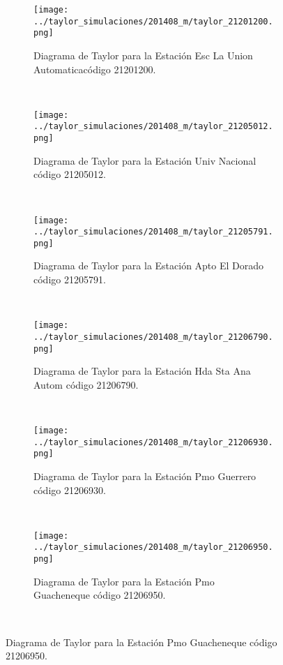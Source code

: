 \begin{figure}[H]
\begin{subfigure}[normla]{0.5\textwidth}
\caption{Diagrama de Taylor para la Estación Esc La Union Automaticacódigo 21201200.}
\texttt{[image: ../taylor\_simulaciones/201408\_m/taylor\_21201200.png]}
\end{subfigure}
~
\begin{subfigure}[normla]{0.5\textwidth}
\caption{Diagrama de Taylor para la Estación Univ Nacional código 21205012.}
\texttt{[image: ../taylor\_simulaciones/201408\_m/taylor\_21205012.png]}
\end{subfigure}
~
\begin{subfigure}[normla]{0.5\textwidth}
\caption{Diagrama de Taylor para la Estación Apto El Dorado código 21205791.}
\texttt{[image: ../taylor\_simulaciones/201408\_m/taylor\_21205791.png]}
\end{subfigure}
~
\begin{subfigure}[normla]{0.5\textwidth}
\caption{Diagrama de Taylor para la Estación Hda Sta Ana Autom código 21206790.}
\texttt{[image: ../taylor\_simulaciones/201408\_m/taylor\_21206790.png]}
\end{subfigure}
~
\begin{subfigure}[normla]{0.5\textwidth}
\caption{Diagrama de Taylor para la Estación Pmo Guerrero código 21206930.}
\texttt{[image: ../taylor\_simulaciones/201408\_m/taylor\_21206930.png]}
\end{subfigure}
~
\begin{subfigure}[normla]{0.5\textwidth}
\caption{Diagrama de Taylor para la Estación Pmo Guacheneque código 21206950.}
\texttt{[image: ../taylor\_simulaciones/201408\_m/taylor\_21206950.png]}
\end{subfigure}
~
\end{figure}
           
